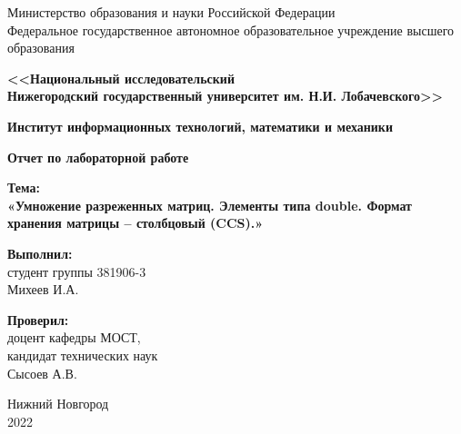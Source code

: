 \documentclass{report}
\begin{document}
\begin{titlepage}

\begin{center}
    Министерство образования и науки Российской Федерации \\
    Федеральное государственное автономное образовательное учреждение высшего образования
\end{center}
\begin{center}
    \textbf{<<Национальный исследовательский\\Нижегородский государственный университет им. Н.И. Лобачевского>>} \\
\end{center}
\begin{center}
    \textbf{Институт информационных технологий, математики и механики}\\
\end{center}

\vspace{4em}

\begin{center}
    \textbf{\Large Отчет по лабораторной работе} \\
\end{center}

\begin{center}
    \textbf{\Large Тема:} \\
    \vspace{1em}
    \textbf{\large «Умножение разреженных матриц. Элементы типа double. Формат хранения матрицы – столбцовый (CCS).»}
\end{center}

\vspace{4em}

\begin{flushright}
\begin{minipage}{0.4\textwidth}
\begin{flushleft}

\textbf{Выполнил:} \\
студент группы 381906-3 \\
Михеев И.А. \\

\vspace

\textbf{Проверил:} \\
доцент кафедры МОСТ, \\
кандидат технических наук \\
Сысоев А.В. \\
\end{flushleft}
\end{minipage}
\end{flushright}
\vspace{\fill}
\begin{center}
Нижний Новгород \\
2022
\end{center}
\end{titlepage}
\end{document}
